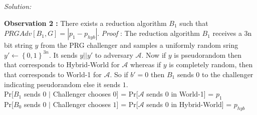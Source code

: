 \documentclass[a4paper, 11pt]{article}
\newenvironment{solution}
    {\textit{Solution:}}
    {\clearpage}
\newcommand{\bit}{\left\{0, 1\right\}}
\newcommand{\calA}{\mathcal{A}}
\begin{document}
\begin{solution}
\begin{enumerate}[(a)]
        \textbf{Observation 2 : } There exists a reduction algorithm $B_1$ such that $PRGAdv[B_1, G] = |p_1 - p_{hyb}|$. 
        \textit{Proof} : The reduction algorithm $B_1$ receives a 3n bit string $y$ from the PRG challenger and samples a uniformly random sring $y' \gets \bit^{3n}$. It sends $y||y'$ to adversary $\calA$. Now if $y$ is pseudorandom then that corresponds to Hybrid-World for $\calA$ whereas if $y$ is completely random, then that corresponds to World-1 for $\calA$. So if $b' =0$ then $B_1$ sends $0$ to the challenger indicating pseudorandom else it sends $1$. \\
        Pr[$B_1$ sends $0$ $\mid$ Challenger chooses $0$] = Pr[$\calA$ sends 0 in World-1] = $p_1$ \\
        Pr[$B_0$ sends $0$ $\mid$ Challenger chooses $1$] = Pr[$\calA$ sends 0 in Hybrid-World] = $p_{hyb}$ \\
    \end{enumerate}
\end{solution}
\end{document}
